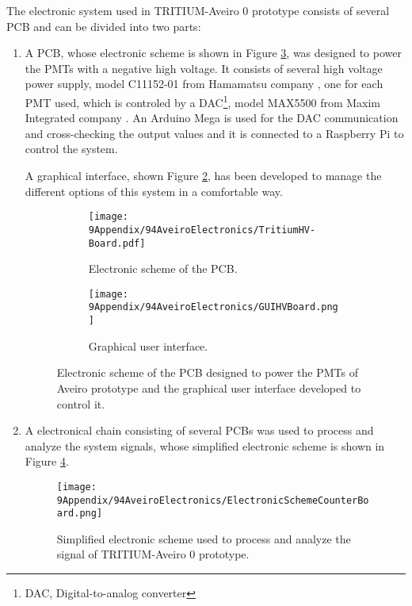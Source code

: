 The electronic system used in TRITIUM-Aveiro 0 prototype consists of several PCB and can be divided into two parts:
\begin{enumerate}
\item{} A PCB, whose electronic scheme is shown in Figure \ref{fig:HVElectronicAveiro}, was designed to power the PMTs with a negative high voltage. It consists of several high voltage power supply, model C11152-01 from Hamamatsu company \cite{PowerSupplyAveiroDataSheet}, one for each PMT used, which is controled by a DAC\footnote{DAC, Digital-to-analog converter}, model MAX5500 from Maxim Integrated company \cite{MAX5500DataSheet}. An Arduino Mega is used for the DAC communication and cross-checking the output values and it is connected to a Raspberry Pi to control the system.

A graphical interface, shown Figure \ref{subfig:GUI}, has been developed to manage the different options of this system in a comfortable way.

\begin{figure}
\centering
    \begin{subfigure}[b]{0.45\textwidth}
    \centering
    \texttt{[image: 9Appendix/94AveiroElectronics/TritiumHV-Board.pdf]}  
    \caption{Electronic scheme of the PCB.\label{subfig:ElectronicSchemeHVBoard}}
    \end{subfigure}
    \hfill
    \begin{subfigure}[b]{0.45\textwidth}
    \centering
    \texttt{[image: 9Appendix/94AveiroElectronics/GUIHVBoard.png]}  
    \caption{Graphical user interface.\label{subfig:GUI}}
    \end{subfigure}
 \caption{Electronic scheme of the PCB designed to power the PMTs of Aveiro prototype and the graphical user interface developed to control it.}
 \label{fig:HVElectronicAveiro}
\end{figure}

\item{} A electronical chain consisting of several PCBs was used to process and analyze the system signals, whose simplified electronic scheme is shown in Figure \ref{fig:ElectronicSchemCounterBoard}.

\begin{figure}[h]
\centering
\texttt{[image: 9Appendix/94AveiroElectronics/ElectronicSchemeCounterBoard.png]}
\caption{Simplified electronic scheme used to process and analyze the signal of TRITIUM-Aveiro 0 prototype. \label{fig:ElectronicSchemCounterBoard}}
\end{figure}


\end{enumerate}
